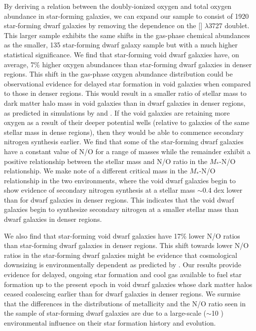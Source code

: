 By deriving a relation between the doubly-ionized oxygen and total oxygen 
abundance in star-forming galaxies, we can expand our sample to consist of 1920 
star-forming dwarf galaxies by removing the dependence on the [] 
$\lambda$3727 doublet.  This larger sample exhibits the same shifts in the 
gas-phase chemical abundances as the smaller, 135 star-forming dwarf galaxy 
sample but with a much higher statistical significance.  We find that 
star-forming void dwarf galaxies have, on average, 7\% higher oxygen abundances 
than star-forming dwarf galaxies in denser regions.  This shift in the gas-phase 
oxygen abundance distribution could be observational evidence for delayed star 
formation in void galaxies when compared to those in denser regions.  This would 
result in a smaller ratio of stellar mass to dark matter halo mass in void 
galaxies than in dwarf galaxies in denser regions, as predicted in simulations 
by \cite{Jung14} and \cite{Tonnesen15}.  If the void galaxies are retaining more 
oxygen as a result of their deeper potential wells (relative to galaxies of the 
same stellar mass in dense regions), then they would be able to commence 
secondary nitrogen synthesis earlier.  We find that some of the star-forming 
dwarf galaxies have a constant value of N/O for a range of masses while the 
remainder exhibit a positive relationship between the stellar mass and N/O ratio 
in the $M_*$-N/O relationship.  We make note of a different critical mass in the 
$M_*$-N/O relationship in the two environments, where the void dwarf galaxies 
begin to show evidence of secondary nitrogen synthesis at a stellar mass 
$\sim$0.4 dex lower than for dwarf galaxies in denser regions.  This indicates 
that the void dwarf galaxies begin to synthesize secondary nitrogen at a smaller 
stellar mass than dwarf galaxies in denser regions.

We also find that star-forming void dwarf galaxies have 17\% lower N/O ratios 
than star-forming dwarf galaxies in denser regions.  This shift towards lower 
N/O ratios in the star-forming dwarf galaxies might be evidence that 
cosmological downsizing is environmentally dependent as predicted by 
\cite{Cen11}.  Our results provide evidence for delayed, ongoing star formation 
and cool gas available to fuel star formation up to the present epoch in void 
dwarf galaxies whose dark matter halos ceased coalescing earlier than for dwarf 
galaxies in denser regions.  We surmise that the differences in the 
distributions of metallicity and the N/O ratio seen in the sample of 
star-forming dwarf galaxies are due to a large-scale ($\sim$10 \hMpc) 
environmental influence on their star formation history and evolution.  

